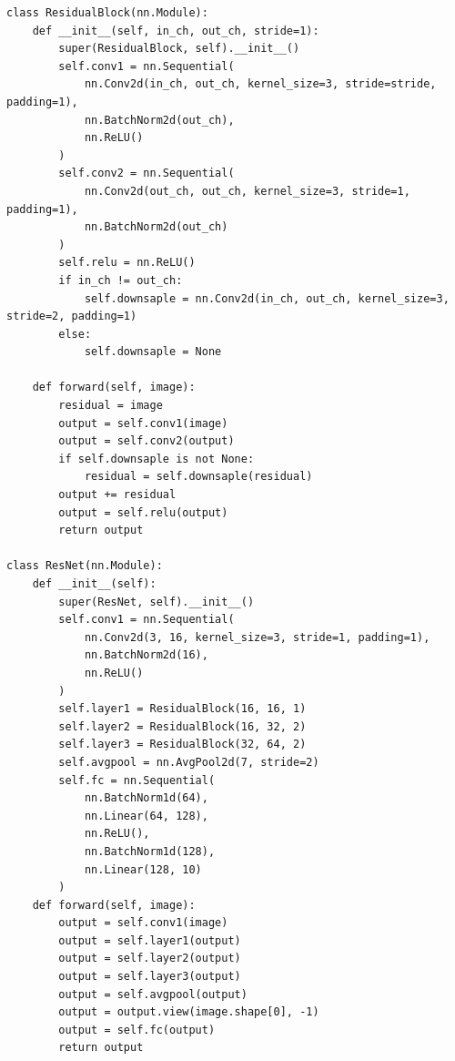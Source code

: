 \documentclass[a4paper, 14pt]{extarticle}
\begin{document}
\begin{lstlisting}[language={},caption={ResNet},label={lst:code4}, breaklines=true]
class ResidualBlock(nn.Module):
    def __init__(self, in_ch, out_ch, stride=1):
        super(ResidualBlock, self).__init__()
        self.conv1 = nn.Sequential(
            nn.Conv2d(in_ch, out_ch, kernel_size=3, stride=stride, padding=1),
            nn.BatchNorm2d(out_ch),
            nn.ReLU()
        )
        self.conv2 = nn.Sequential(
            nn.Conv2d(out_ch, out_ch, kernel_size=3, stride=1, padding=1),
            nn.BatchNorm2d(out_ch)
        )
        self.relu = nn.ReLU()
        if in_ch != out_ch:
            self.downsaple = nn.Conv2d(in_ch, out_ch, kernel_size=3, stride=2, padding=1)
        else:
            self.downsaple = None

    def forward(self, image):
        residual = image
        output = self.conv1(image)
        output = self.conv2(output)
        if self.downsaple is not None:
            residual = self.downsaple(residual)
        output += residual
        output = self.relu(output)
        return output

class ResNet(nn.Module):
    def __init__(self):
        super(ResNet, self).__init__()
        self.conv1 = nn.Sequential(
            nn.Conv2d(3, 16, kernel_size=3, stride=1, padding=1),
            nn.BatchNorm2d(16),
            nn.ReLU()
        )
        self.layer1 = ResidualBlock(16, 16, 1)
        self.layer2 = ResidualBlock(16, 32, 2)
        self.layer3 = ResidualBlock(32, 64, 2)
        self.avgpool = nn.AvgPool2d(7, stride=2)
        self.fc = nn.Sequential(
            nn.BatchNorm1d(64),
            nn.Linear(64, 128),
            nn.ReLU(),
            nn.BatchNorm1d(128),
            nn.Linear(128, 10)
        )
    def forward(self, image):
        output = self.conv1(image)
        output = self.layer1(output)
        output = self.layer2(output)
        output = self.layer3(output)
        output = self.avgpool(output)
        output = output.view(image.shape[0], -1)
        output = self.fc(output)
        return output
\end{lstlisting}
\end{document}
